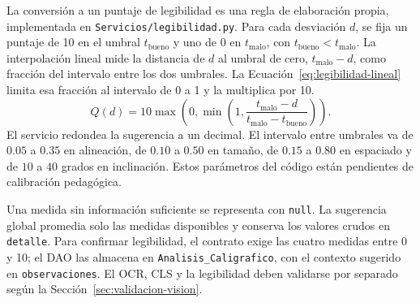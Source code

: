 La conversión a un puntaje de legibilidad es una regla de elaboración propia, implementada en \texttt{Servicios/legibilidad.py}. Para cada desviación $d$, se fija un puntaje de 10 en el umbral $t_{\mathrm{bueno}}$ y uno de 0 en $t_{\mathrm{malo}}$, con $t_{\mathrm{bueno}}<t_{\mathrm{malo}}$. La interpolación lineal mide la distancia de $d$ al umbral de cero, $t_{\mathrm{malo}}-d$, como fracción del intervalo entre los dos umbrales. La Ecuación~\eqref{eq:legibilidad-lineal} limita esa fracción al intervalo de 0 a 1 y la multiplica por 10.
\begin{equation}
 Q(d)=10\max\left(0,\min\left(1,
 \frac{t_{\mathrm{malo}}-d}{t_{\mathrm{malo}}-t_{\mathrm{bueno}}}\right)\right).
 \label{eq:legibilidad-lineal}
\end{equation}
El servicio redondea la sugerencia a un decimal. El intervalo entre umbrales va de $0.05$ a $0.35$ en alineación, de $0.10$ a $0.50$ en tamaño, de $0.15$ a $0.80$ en espaciado y de $10$ a $40$ grados en inclinación. Estos parámetros del código están pendientes de calibración pedagógica.

Una medida sin información suficiente se representa con \texttt{null}. La sugerencia global promedia solo las medidas disponibles y conserva los valores crudos en \texttt{detalle}. Para confirmar legibilidad, el contrato exige las cuatro medidas entre 0 y 10; el DAO las almacena en \texttt{Analisis\_Caligrafico}, con el contexto sugerido en \texttt{observaciones}. El OCR, CLS y la legibilidad deben validarse por separado según la Sección~\ref{sec:validacion-vision}.
